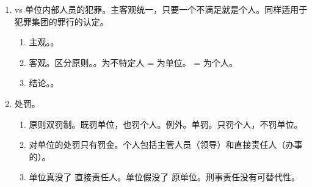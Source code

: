 \begin{enumerate}
\begin{enumerate}
          \item {}。
        \end{enumerate}
  \item vs 单位内部人员的犯罪。主客观统一，只要一个不满足就是个人。同样适用于犯罪集团的罪行的认定。
        \begin{enumerate}
          \item 主观。。
          \item 客观。区分原则。。为不特定人 = 为单位。 = 为个人。
          \item 结论。。
        \end{enumerate}
  \item 处罚。
        \begin{enumerate}
          \item 原则双罚制。既罚单位，也罚个人。例外。单罚。只罚个人，不罚单位。
          \item 对单位的处罚只有罚金。个人包括主管人员（领导）和直接责任人（办事的）。
          \item \yi 单位真没了 \yjt 直接责任人。\er 单位假没了 \yjt 原单位。刑事责任没有可替代性。
        \end{enumerate}
\end{enumerate}
